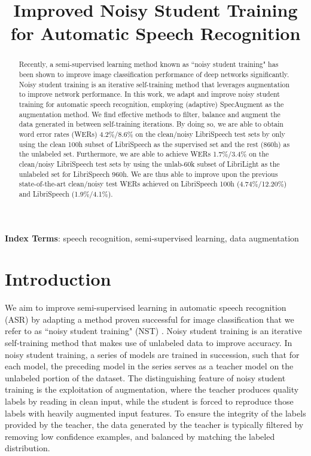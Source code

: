 \documentclass[a4paper]{article}
\title{Improved Noisy Student Training for Automatic Speech Recognition}
\begin{document}
\maketitle
\begin{abstract}
Recently, a semi-supervised learning method known as ``noisy student training" has been shown to improve image classification performance of deep networks significantly. Noisy student training is an iterative self-training method that leverages augmentation to improve network performance. In this work, we adapt and improve noisy student training for automatic speech recognition, employing (adaptive) SpecAugment as the augmentation method. We find effective methods to filter, balance and augment the data generated in between self-training iterations. By doing so, we are able to obtain word error rates (WERs) 4.2\%/8.6\% on the clean/noisy LibriSpeech test sets by only using the clean 100h subset of LibriSpeech as the supervised set and the rest (860h) as the unlabeled set. Furthermore, we are able to achieve WERs 1.7\%/3.4\% on the clean/noisy LibriSpeech test sets by using the unlab-60k subset of LibriLight as the unlabeled set for LibriSpeech 960h. We are thus able to improve upon the previous state-of-the-art clean/noisy test WERs achieved on LibriSpeech 100h (4.74\%/12.20\%) and LibriSpeech (1.9\%/4.1\%).
\end{abstract}
\noindent\textbf{Index Terms}: speech recognition, semi-supervised learning, data augmentation

\section{Introduction}

We aim to improve semi-supervised learning in automatic speech recognition (ASR) by adapting a method proven successful for image classification that we refer to as ``noisy student training" (NST) \cite{noisystudent}. 
Noisy student training is an iterative self-training method that makes use of unlabeled data to improve accuracy. In noisy student training, a series of models are trained in succession, such that for each model, the preceding model in the series serves as a teacher model on the unlabeled portion of the dataset. The distinguishing feature of noisy student training is the exploitation of augmentation, where the teacher produces quality labels by reading in clean input, while the student is forced to reproduce those labels with heavily augmented input features. To ensure the integrity of the labels provided by the teacher, the data generated by the teacher is typically filtered by removing low confidence examples, and balanced by matching the labeled distribution.
\end{document}
